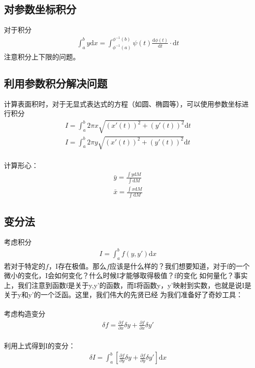 \documentclass[12pt,a4paper,UTF8]{ctexbook}
\theoremstyle{plain}
\begin{document}
\subsection{对参数坐标积分}
对于积分
\begin{align*}
    \int_a^b y\mathrm d x=\int_{\phi^{-1}(a)}^{\phi^{-1}(b)} \psi(t)\frac{\mathrm d \phi(t)}{\mathrm d t}\cdot \mathrm d t
\end{align*}
注意积分上下限的问题。
\subsection{利用参数积分解决问题}
计算表面积时，对于无显式表达式的方程（如圆、椭圆等），可以使用参数坐标进行积分
\begin{align*}
    I=\int_a^b 2\pi x \sqrt{(x'(t))^2+(y'(t))^2}\mathrm d t\\
    I=\int_a^b 2\pi y \sqrt{(x'(t))^2+(y'(t))^2}\mathrm d t
\end{align*}
\paragraph{}计算形心：
\begin{align*}
    \bar y =\frac{\int y \mathrm d M}{\int \mathrm d M}\\
    \bar x =\frac{\int x \mathrm d M}{\int \mathrm d M}
\end{align*}
\subsection{变分法}
考虑积分
\begin{align*}
    I=\int_a^b f(y,y')\mathrm d x
\end{align*}
若对于特定的$f$，I存在极值。那么$f$应该是什么样的？我们想要知道，对于f的一个微小的变化，I会如何变化？什么时候I才能够取得极值？f的变化
如何量化？事实上，我们注意到函数f是关于y,y'的函数，而I将函数y，y'映射到实数，也就是说I是关于y和y'的一个泛函。这里，我们伟大的先贤已经
为我们准备好了奇妙工具：
\paragraph{}考虑构造变分
\begin{align*}
    \delta f=\frac{\partial f}{\partial x}\delta y +\frac{\partial f}{\partial x}\delta y'
\end{align*}
\paragraph{}利用上式得到I的变分：
\begin{align*}
    \delta I = \int_a^b [\frac{\partial f}{\partial y}\delta y +\frac{\partial f}{\partial y}\delta y']\mathrm d x
\end{align*}
\end{document}
